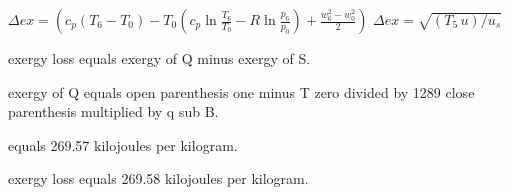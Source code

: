 \( \Delta ex = (c_p (T_6 - T_0) - T_0 (c_p \ln \frac{T_6}{T_0} - R \ln \frac{p_6}{p_0}) + \frac{w_6^2 - w_0^2}{2}) \)  
\( \Delta ex = \sqrt{(T_5 \, u) / u_s} \)

exergy loss equals exergy of Q minus exergy of S.  

exergy of Q equals open parenthesis one minus T zero divided by 1289 close parenthesis multiplied by q sub B.  

equals 269.57 kilojoules per kilogram.  

exergy loss equals 269.58 kilojoules per kilogram.